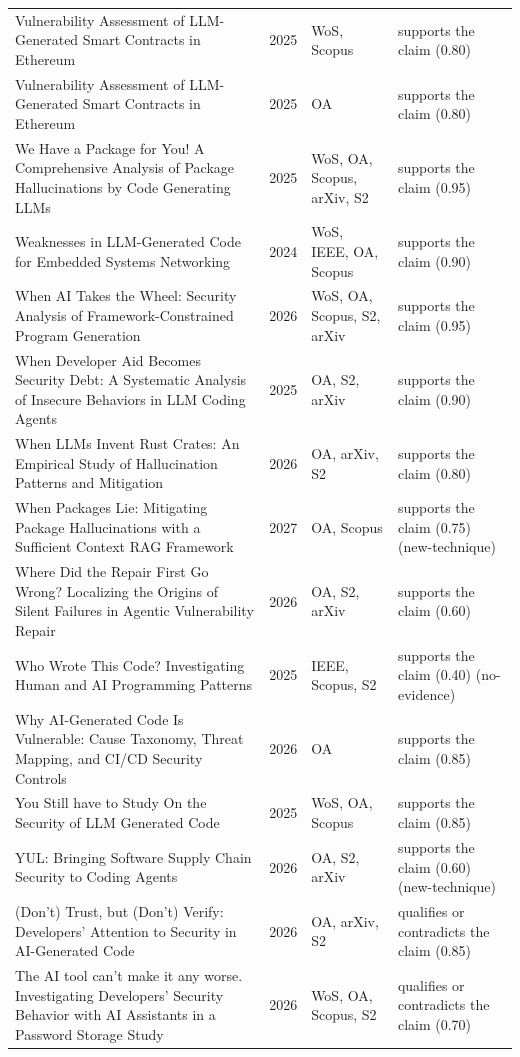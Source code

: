 \begin{longtable}{@{}%
  >{\raggedright\arraybackslash}p{}c%
  >{\raggedright\arraybackslash}p{}%
  >{\raggedright\arraybackslash}p{}@{}}
Vulnerability Assessment of LLM-Generated Smart Contracts in Ethereum & 2025 & WoS, Scopus & supports the claim (0.80) \\
Vulnerability Assessment of LLM-Generated Smart Contracts in Ethereum & 2025 & OA & supports the claim (0.80) \\
We Have a Package for You! A Comprehensive Analysis of Package Hallucinations by Code Generating LLMs & 2025 & WoS, OA, Scopus, arXiv, S2 & supports the claim (0.95) \\
Weaknesses in LLM-Generated Code for Embedded Systems Networking & 2024 & WoS, IEEE, OA, Scopus & supports the claim (0.90) \\
When AI Takes the Wheel: Security Analysis of Framework-Constrained Program Generation & 2026 & WoS, OA, Scopus, S2, arXiv & supports the claim (0.95) \\
When Developer Aid Becomes Security Debt: A Systematic Analysis of Insecure Behaviors in LLM Coding Agents & 2025 & OA, S2, arXiv & supports the claim (0.90) \\
When LLMs Invent Rust Crates: An Empirical Study of Hallucination Patterns and Mitigation & 2026 & OA, arXiv, S2 & supports the claim (0.80) \\
When Packages Lie: Mitigating Package Hallucinations with a Sufficient Context RAG Framework & 2027 & OA, Scopus & supports the claim (0.75) (new-technique) \\
Where Did the Repair First Go Wrong? Localizing the Origins of Silent Failures in Agentic Vulnerability Repair & 2026 & OA, S2, arXiv & supports the claim (0.60) \\
Who Wrote This Code? Investigating Human and AI Programming Patterns & 2025 & IEEE, Scopus, S2 & supports the claim (0.40) (no-evidence) \\
Why AI-Generated Code Is Vulnerable: Cause Taxonomy, Threat Mapping, and CI/CD Security Controls & 2026 & OA & supports the claim (0.85) \\
You Still have to Study On the Security of LLM Generated Code & 2025 & WoS, OA, Scopus & supports the claim (0.85) \\
YUL: Bringing Software Supply Chain Security to Coding Agents & 2026 & OA, S2, arXiv & supports the claim (0.60) (new-technique) \\
(Don't) Trust, but (Don't) Verify: Developers' Attention to Security in AI-Generated Code & 2026 & OA, arXiv, S2 & qualifies or contradicts the claim (0.85) \\
\textquotedbl{}The AI tool can't make it any worse.\textquotedbl{} Investigating Developers' Security Behavior with AI Assistants in a Password Storage Study & 2026 & WoS, OA, Scopus, S2 & qualifies or contradicts the claim (0.70) \\

\end{longtable}
